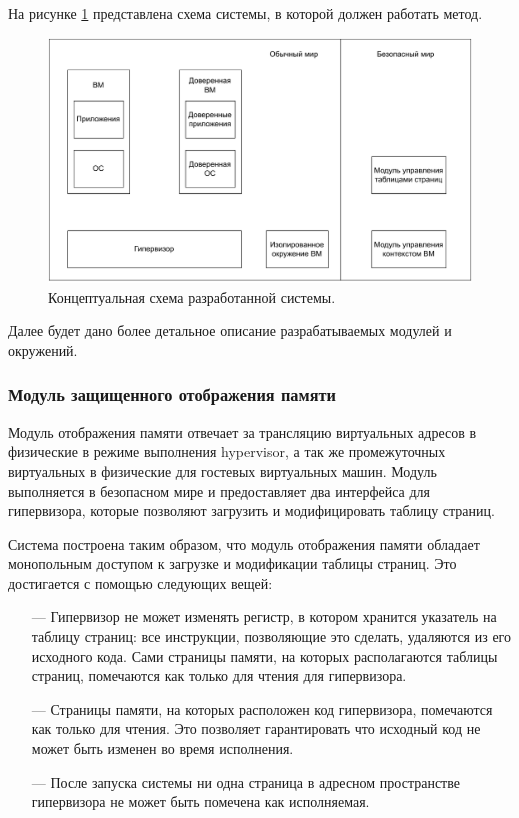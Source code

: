 На рисунке \ref{fig:full-design} представлена схема системы, в которой должен работать метод.

\begin{figure}[h]
	\centering
	\includegraphics[width=\textwidth]{img/full-design.pdf}
	\caption{Концептуальная схема разработанной системы.}
	\label{fig:full-design}
\end{figure}

Далее будет дано более детальное описание разрабатываемых модулей и окружений.

\subsubsection{Модуль защищенного отображения памяти}

Модуль отображения памяти отвечает за трансляцию виртуальных адресов в физические в режиме выполнения hypervisor, а так же промежуточных виртуальных в физические для гостевых виртуальных машин. Модуль выполняется в безопасном мире и предоставляет два интерфейса для гипервизора, которые позволяют загрузить и модифицировать таблицу страниц.

Система построена таким образом, что модуль отображения памяти обладает монопольным доступом к загрузке и модификации таблицы страниц. Это достигается с помощью следующих вещей:

\begin{itemize}
	\item [---] Гипервизор не может изменять регистр, в котором хранится указатель на таблицу страниц: все инструкции, позволяющие это сделать, удаляются из его исходного кода. Сами страницы памяти, на которых располагаются таблицы страниц, помечаются как только для чтения для гипервизора.

	\item [---] Страницы памяти, на которых расположен код гипервизора, помечаются как только для чтения. Это позволяет гарантировать что исходный код не может быть изменен во время исполнения.

	\item [---] После запуска системы ни одна страница в адресном пространстве гипервизора не может быть помечена как исполняемая.
\end{itemize}

